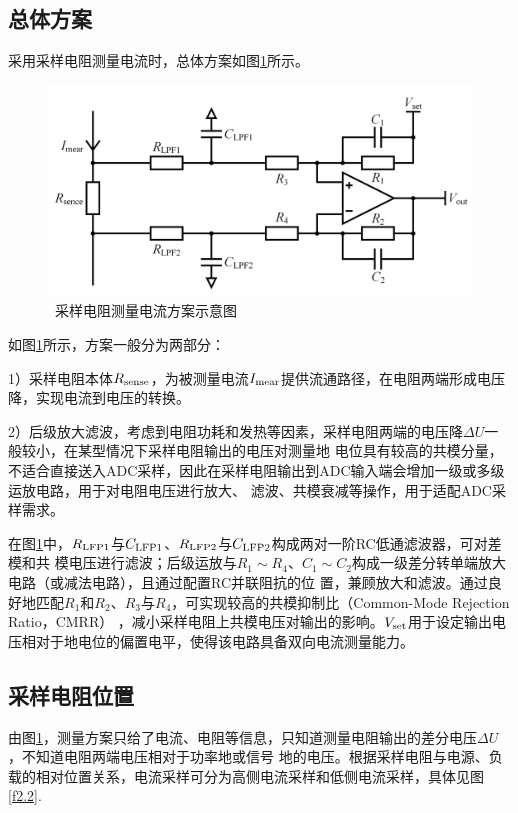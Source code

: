 \documentclass[UTF8]{ctexart}
\numberwithin{equation}{section} %
\numberwithin{figure}{section}
\begin{document}
\subsection{总体方案}
    采用采样电阻测量电流时，总体方案如图\ref{f2.1}所示。
    \begin{figure}[htbp] %
        \centering
        \includegraphics[scale = 1.4]{picture/1_resistor_sample.png}
        \caption{\space\ 采样电阻测量电流方案示意图} %
        \label{f2.1}
    \end{figure}

    如图\ref{f2.1}所示，方案一般分为两部分：

    1）采样电阻本体$R_{\rm sense}$，为被测量电流$I_{\rm mear}$提供流通路径，在电阻两端形成电压降，实现电流到电压的转换。

    2）后级放大滤波，考虑到电阻功耗和发热等因素，采样电阻两端的电压降$\Delta U$一般较小，在某型情况下采样电阻输出的电压对测量地
    电位具有较高的共模分量，不适合直接送入ADC采样，因此在采样电阻输出到ADC输入端会增加一级或多级运放电路，用于对电阻电压进行放大、
    滤波、共模衰减等操作，用于适配ADC采样需求。

    在图\ref{f2.1}中，$R_{\rm LFP1}$与$C_{\rm LFP1}$、$R_{\rm LFP2}$与$C_{\rm LFP2}$构成两对一阶RC低通滤波器，可对差模和共
    模电压进行滤波；后级运放与$R_1 \sim R_4$、$C_1 \sim C_2$构成一级差分转单端放大电路（或减法电路），且通过配置RC并联阻抗的位
    置，兼顾放大和滤波。通过良好地匹配$R_1$和$R_2$、$R_3$与$R_4$，可实现较高的共模抑制比（Common-Mode Rejection Ratio，CMRR）
    ，减小采样电阻上共模电压对输出的影响。$V_{\rm set}$用于设定输出电压相对于地电位的偏置电平，使得该电路具备双向电流测量能力。

\subsection{采样电阻位置}
    由图\ref{f2.1}，测量方案只给了电流、电阻等信息，只知道测量电阻输出的差分电压$\Delta U$，不知道电阻两端电压相对于功率地或信号
    地的电压。根据采样电阻与电源、负载的相对位置关系，电流采样可分为高侧电流采样和低侧电流采样，具体见图\ref{f2.2}.
\end{document}
